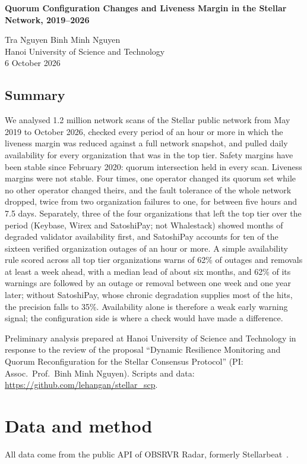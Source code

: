 \documentclass[11pt,a4paper]{article}
\begin{document}
{\Large\bfseries Quorum Configuration Changes and Liveness Margin in the Stellar Network, 2019--2026}

Tra Nguyen \quad Binh Minh Nguyen \\
Hanoi University of Science and Technology \\
6 October 2026

\subsection*{Summary}
We analysed 1.2 million network scans of the Stellar public network from May 2019 to October 2026, checked every period of an hour or more in which the liveness margin was reduced against a full network snapshot, and pulled daily availability for every organization that was in the top tier. Safety margins have been stable since February 2020: quorum intersection held in every scan. Liveness margins were not stable. Four times, one operator changed its quorum set while no other operator changed theirs, and the fault tolerance of the whole network dropped, twice from two organization failures to one, for between five hours and 7.5 days. Separately, three of the four organizations that left the top tier over the period (Keybase, Wirex and SatoshiPay; not Whalestack) showed months of degraded validator availability first, and SatoshiPay accounts for ten of the sixteen verified organization outages of an hour or more. A simple availability rule scored across all top tier organizations warns of 62\% of outages and removals at least a week ahead, with a median lead of about six months, and 62\% of its warnings are followed by an outage or removal between one week and one year later; without SatoshiPay, whose chronic degradation supplies most of the hits, the precision falls to 35\%. Availability alone is therefore a weak early warning signal; the configuration side is where a check would have made a difference.

Preliminary analysis prepared at Hanoi University of Science and Technology in response to the review of the proposal ``Dynamic Resilience Monitoring and Quorum Reconfiguration for the Stellar Consensus Protocol'' (PI: Assoc.\ Prof.\ Binh Minh Nguyen). Scripts and data: \url{https://github.com/lehangan/stellar_scp}.

\section{Data and method}
All data come from the public API of OBSRVR Radar, formerly Stellarbeat~\cite{radar}.
\end{document}
